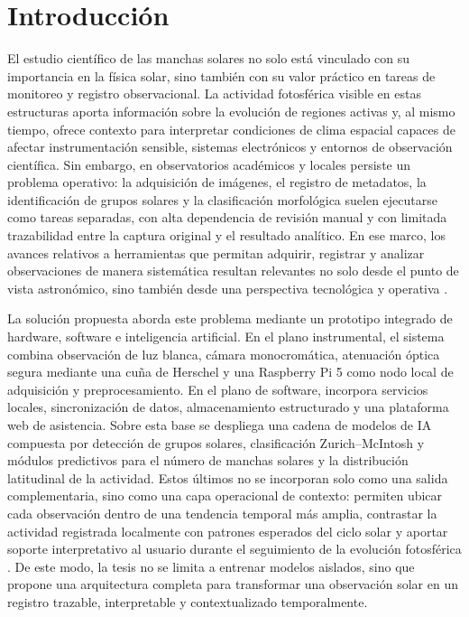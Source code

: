 \chapter[Introducción]{Introducción\label{cap:introduccion}}

El estudio científico de las manchas solares no solo está vinculado con su importancia en la física solar, sino también con su valor práctico en tareas de monitoreo y registro observacional. La actividad fotosférica visible en estas estructuras aporta información sobre la evolución de regiones activas y, al mismo tiempo, ofrece contexto para interpretar condiciones de clima espacial capaces de afectar instrumentación sensible, sistemas electrónicos y entornos de observación científica. Sin embargo, en observatorios académicos y locales persiste un problema operativo: la adquisición de imágenes, el registro de metadatos, la identificación de grupos solares y la clasificación morfológica suelen ejecutarse como tareas separadas, con alta dependencia de revisión manual y con limitada trazabilidad entre la captura original y el resultado analítico. En ese marco, los avances relativos a herramientas que permitan adquirir, registrar y analizar observaciones de manera sistemática resultan relevantes no solo desde el punto de vista astronómico, sino también desde una perspectiva tecnológica y operativa \citep{hathaway2010solarcycle,usaf2003sunspot}.

La solución propuesta aborda este problema mediante un prototipo integrado de hardware, software e inteligencia artificial. En el plano instrumental, el sistema combina observación de luz blanca, cámara monocromática, atenuación óptica segura mediante una cuña de Herschel y una Raspberry Pi 5 como nodo local de adquisición y preprocesamiento. En el plano de software, incorpora servicios locales, sincronización de datos, almacenamiento estructurado y una plataforma web de asistencia. Sobre esta base se despliega una cadena de modelos de IA compuesta por detección de grupos solares, clasificación Zurich--McIntosh y módulos predictivos para el número de manchas solares y la distribución latitudinal de la actividad. Estos últimos no se incorporan solo como una salida complementaria, sino como una capa operacional de contexto: permiten ubicar cada observación dentro de una tendencia temporal más amplia, contrastar la actividad registrada localmente con patrones esperados del ciclo solar y aportar soporte interpretativo al usuario durante el seguimiento de la evolución fotosférica \citep{mcintosh1990classification,bornmann1994flarerates,pesnell2012predictions,clette2014revisiting}. De este modo, la tesis no se limita a entrenar modelos aislados, sino que propone una arquitectura completa para transformar una observación solar en un registro trazable, interpretable y contextualizado temporalmente.

